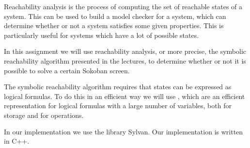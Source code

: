 Reachability analysis is the process of computing the set of reachable states 
of a system. This can be used to build a model checker for a system, which can
determine whether or not a system satisfies some given properties. This
is particularly useful for systems which have a lot of possible states.

In this assignment we will use reachability analysis, or more precise, the 
symbolic reachability algorithm presented in the lectures, to determine whether
or not it is possible to solve a certain Sokoban screen.

The symbolic reachability algorithm requires that states can be expressed as
logical formulas. To do this in an efficient way we will use \robdds, which 
are an efficient representation for logical formulas with a large number of
variables, both for storage and for operations.

In our implementation we use the \robdd library Sylvan. Our implementation
is written in C++.